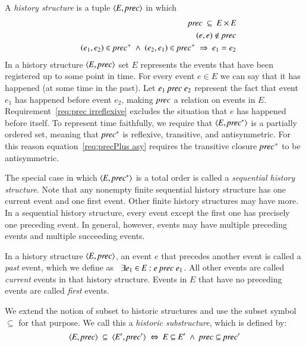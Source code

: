 \documentclass{elsarticle}
\def\id#1{\text{\em #1\/}}
\def\Events{{\mathit E}}
\begin{document}
	A {\em history structure} is a tuple $\la \Events, \id{prec}\ra$ in which
\begin{eqnarray}
	&&\id{prec}\ \subseteq\ \Events\times\Events\label{req:precInE}\\
	&&(e,e)\notin\id{prec}\label{req:prec irreflexive}\\
	&&(e_1,e_2)\in\id{prec}^+\ \wedge\ (e_2,e_1)\in\id{prec}^+\ \Rightarrow\ e_1=e_2\label{req:precPlus asy}
\end{eqnarray}
	In a history structure $\la \Events, \id{prec}\ra$ set $\Events$ represents the events that have been registered up to some point in time.
	For every event $e\in\Events$ we can say that it has happened (at some time in the past).
	Let $e_1\ \id{prec}\ e_2$ represent the fact that event $e_1$ has happened before event $e_2$,
	making $\id{prec}$ a relation on events in $\Events$.
	Requirement~\ref{req:prec irreflexive} excludes the situation that $e$ has happened before itself.
	To represent time faithfully, we require that $\la\Events,\id{prec}^*\ra$ is a partially ordered set,
	meaning that $\id{prec}^*$ is reflexive, transitive, and antisymmetric.
	For this reason equation~\ref{req:precPlus asy} requires the transitive closure $\id{prec}^+$ to be antisymmetric.

	The special case in which $\la\Events,\id{prec}^*\ra$ is a total order is called a {\em sequential history structure}.
	Note that any nonempty finite sequential history structure has one current event and one first event.
	Other finite history structures may have more.
	In a sequential history structure, every event except the first one has precisely one preceding event.
	In general, however, events may have multiple preceding events and multiple succeeding events.

	In a history structure $\la \Events, \id{prec}\ra$, an event $e$ that precedes another event is called a {\em past} event,
	which we define as \ $\exists e_1\in\Events: e\ \id{prec}\ e_1$.
	All other events are called {\em current} events in that history structure.
	Events in $\Events$ that have no preceding events are called {\em first} events.

	We extend the notion of subset to historic structures and use the subset symbol $\subseteq$ for that purpose.
	We call this a {\em historic substructure}, which is defined by:
\begin{equation}
\label{def:historic substructure}
	\la \Events, \id{prec}\ra\ \subseteq\ \la \Events', \id{prec}'\ra\ \Leftrightarrow\ \Events\subseteq\Events'\ \wedge\ \id{prec}\subseteq\id{prec}'
\end{equation}
\end{document}
